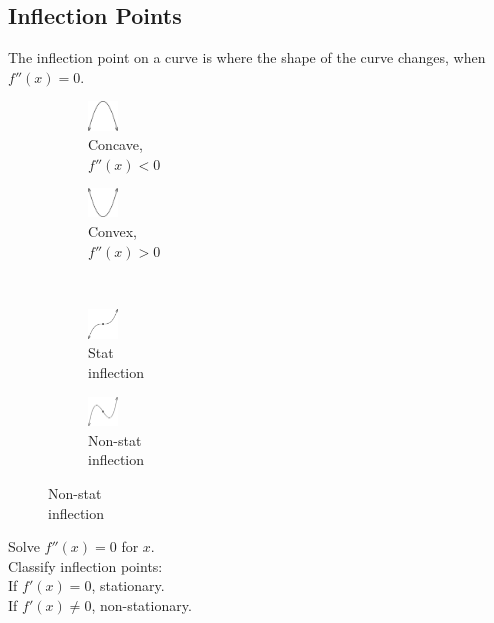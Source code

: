 \documentclass[10pt, a4paper, titlepage]{article}
\begin{document}
\begin{multicols*}{3}
\subsection{Inflection Points}
The inflection point on a curve is where the shape of the curve changes, when $f''(x)=0$.
\begin{figure}[H]
	\centering
	\begin{subfigure}[b]{0.1\textwidth}
		\centering
		\includegraphics[width=0.8cm]{concave.png}
		\caption*{Concave,\\$f''(x)<0$}
	\end{subfigure}
	\hfill
	\begin{subfigure}[b]{0.1\textwidth}
		\centering
		\includegraphics[width=0.8cm]{convex.png}
		\caption*{Convex,\\$f''(x)>0$}
	\end{subfigure}
	\\
	\centering
	\begin{subfigure}[b]{0.1\textwidth}
		\centering
		\includegraphics[width=0.8cm]{stat_inflection.png}
		\caption*{Stat\\inflection}
	\end{subfigure}
	\hfill
	\begin{subfigure}[b]{0.1\textwidth}
		\centering
		\includegraphics[width=0.8cm]{non_stat_inflection.png}
		\caption*{Non-stat\\inflection}
	\end{subfigure}
\end{figure}
Solve $f''(x)=0$ for $x$.\\
Classify inflection points:\\
If $f'(x)=0$, stationary.\\
If $f'(x)\neq 0$, non-stationary.\\

\dotfill

\end{multicols*}
\end{document}
